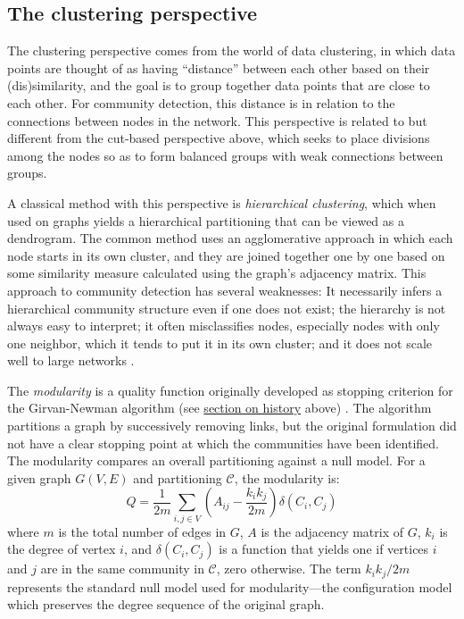 \hypertarget{the-clustering-perspective}{\subsection{The clustering
perspective}\label{the-clustering-perspective}}

The clustering perspective comes from the world of data clustering, in
which data points are thought of as having ``distance'' between each
other based on their (dis)similarity, and the goal is to group together
data points that are close to each other. For community detection, this
distance is in relation to the connections between nodes in the network.
This perspective is related to but different from the cut-based
perspective above, which seeks to place divisions among the nodes so as
to form balanced groups with weak connections between groups.

A classical method with this perspective is \emph{hierarchical
clustering}, which when used on graphs yields a hierarchical
partitioning that can be viewed as a dendrogram. The common method uses
an agglomerative approach in which each node starts in its own cluster,
and they are joined together one by one based on some similarity measure
calculated using the graph's adjacency matrix. This approach to
community detection has several weaknesses: It necessarily infers a
hierarchical community structure even if one does not exist; the
hierarchy is not always easy to interpret; it often misclassifies nodes,
especially nodes with only one neighbor, which it tends to put it in its
own cluster; and it does not scale well to large networks
\autocite{fortunato_community_2010}.

The \emph{modularity} is a quality function originally developed as
stopping criterion for the Girvan-Newman algorithm (see
\protect\hyperlink{history}{section on history} above)
\autocites{newman_finding_2004}{newman_modularity_2006}. The algorithm
partitions a graph by successively removing links, but the original
formulation did not have a clear stopping point at which the communities
have been identified. The modularity compares an overall partitioning
against a null model. For a given graph \(G(V, E)\) and partitioning
\(\mathcal{C}\), the modularity is:
\[Q = \frac{1}{2m} \sum_{i,j \in V} \left(A_{ij} - \frac{k_i k_j}{2m}\right) \delta(C_i, C_j)\]
where \(m\) is the total number of edges in \(G\), \(A\) is the
adjacency matrix of \(G\), \(k_i\) is the degree of vertex \(i\), and
\(\delta(C_i, C_j)\) is a function that yields one if vertices \(i\) and
\(j\) are in the same community in \(\mathcal{C}\), zero otherwise. The
term \(k_i k_j / 2m\) represents the standard null model used for
modularity---the configuration model which preserves the degree sequence
of the original graph.

